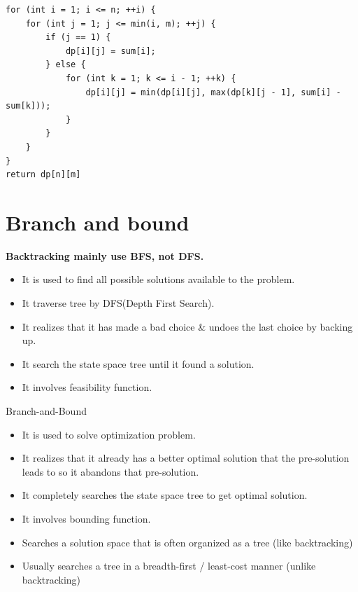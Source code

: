 \documentclass[a4paper,11pt,twoside]{book}
\begin{document}
\begin{lstlisting}	
for (int i = 1; i <= n; ++i) {
	for (int j = 1; j <= min(i, m); ++j) {
		if (j == 1) {
			dp[i][j] = sum[i];
		} else {
			for (int k = 1; k <= i - 1; ++k) {
				dp[i][j] = min(dp[i][j], max(dp[k][j - 1], sum[i] - sum[k]));
			}
		}
	}
}
return dp[n][m]	
\end{lstlisting}	
	

	


\section{Branch and bound}

	\par \textbf{Backtracking mainly use BFS, not DFS.} 
\begin{itemize}
\item It is used to find all possible solutions available to the problem.

\item It traverse tree by DFS(Depth First Search).

\item It realizes that it has made a bad choice \& undoes the last choice by backing up.

\item It search the state space tree until it found a solution.

\item It involves feasibility function.
\end{itemize}


	\par Branch-and-Bound
\begin{itemize}
\item It is used to solve optimization problem.

\item It realizes that it already has a better optimal solution that the pre-solution leads to so it abandons that pre-solution.

\item It completely searches the state space tree to get optimal solution.

\item It involves bounding function.

\item Searches a solution space that is often organized as a tree (like backtracking)

\item Usually searches a tree in a breadth-first / least-cost manner (unlike backtracking)

\end{itemize}
\end{document}
